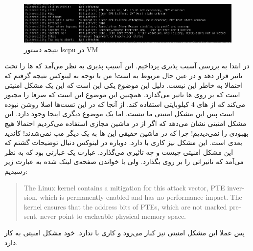 \begin{figure}[H]
    \centering
    \includegraphics[scale=0.4]{pictures/postgres/results/VM-Vulnerability.png}
    \caption{نتیجه دستور lscpu در VM}
    \label{fig:postgres:results:lscpu:vm}
\end{figure}
در ابتدا به بررسی آسیب پذیری
پرداخیم. این آسیپ پذیری به نظر می‌آمد که
ها
را تحت تاثیر قرار دهد و در عین حال مربوط به
است! من با توجه به
لینوکس نتیجه گرفتم که احتمالا به خاطر این
نیست. دلیل این موضوع یکی این است که این یک مشکل امنیتی است که بر روی
ها
تاثیر می‌گذارد. همچنین
این موضوع این است که صرفا
را مجبور می‌کند که از
های
4 کیلوبایتی استفاده کند.
از آنجا که در این تست‌ها
اصلا روشن نبوده است پس این مشکل امنیتی ما نیست.
اما یک موضوع دیگری اینجا وجود دارد. این مشکل امنیتی نشان می‌دهد که اگر از
در ماشین مجازی استفاده می‌کردیم احتمالا هیچ بهبودی را نمی‌دیدیم! چرا که در ماشین حقیقی این
ها
به یک
دیگر مپ نمی‌شدند!
کاندید بعدی
است. این مشکل نیز کاری با
دارد. دوباره در
لینوکس دنبال توضیحات گشتم که این مشکل امنیتی چیست و چه تاثیری می‌گذارد. عبارت
یک عبارتی بود که به نظر می‌آمد که تاثیراتی را بر روی
بگذارد. ولی با خواندن صفحه‌ی لینک شده به عبارت زیر رسیدیم:
\begin{latin}
\begin{quote}
    The Linux kernel contains a mitigation for this attack vector, PTE inversion, which is permanently enabled and has no performance impact. The kernel ensures that the address bits of PTEs, which are not marked present, never point to cacheable physical memory space.
\end{quote}
\end{latin}
پس عملا این مشکل امنیتی نیز کنار می‌رود و کاری با
ندارد. خود مشکل امنیتی به
کار دارد.

